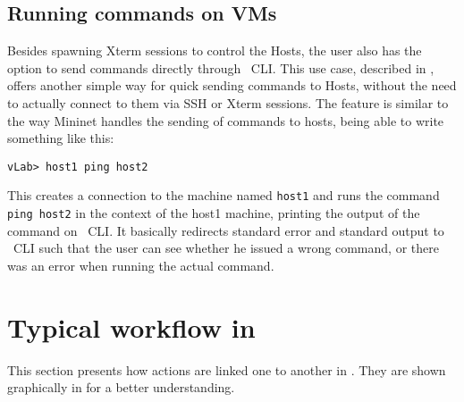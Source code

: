 \subsection{Running commands on VMs}
\label{sub-sec:run-cmd}


Besides spawning Xterm sessions to control the Hosts, the user also has the option to send commands directly through \project\ CLI.
This use case, described in , offers another simple way for quick sending commands to Hosts, without the need to actually connect to them via SSH or Xterm sessions.
The feature is similar to the way Mininet handles the sending of commands to hosts, being able to write something like this:

\lstset{label=lst:ping-example}
\begin{lstlisting}
vLab> host1 ping host2
\end{lstlisting}

This creates a connection to the machine named \texttt{host1} and runs the command \texttt{ping host2} in the context of the host1 machine, printing the output of the command on \project\ CLI.
It basically redirects standard error and standard output to \project\ CLI such that the user can see whether he issued a wrong command, or there was an error when running the actual command.

\section{Typical workflow in \project}

This section presents how actions are linked one to another in \project.
They are shown graphically in  for a better understanding.


